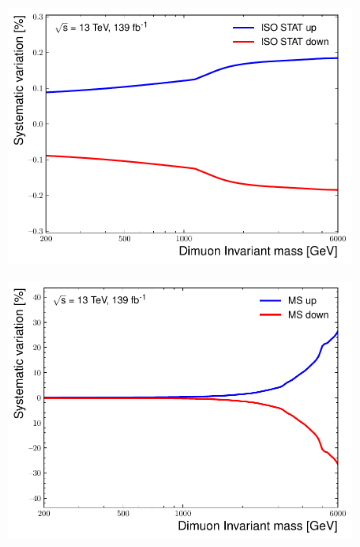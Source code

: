 \begin{figure}[]
    \centering
    \begin{subfigure}[b]{0.42\textwidth}
        \centering
        \includegraphics[width=\textwidth]{figures/analysis/datamc/Uncertainties/exp/mm/m_uu_pstOR_MUON_EFF_ISO_STAT__1up.pdf}
        \label{fig:uncert:mmIso}
    \end{subfigure}
    \begin{subfigure}[b]{0.42\textwidth}
        \centering
        \includegraphics[width=\textwidth]{figures/analysis/datamc/Uncertainties/exp/mm/m_uu_pstOR_MUON_MS__1up.pdf}
        \label{fig:uncert:mmMC}
    \end{subfigure}
    \begin{subfigure}[b]{0.42\textwidth}

\end{subfigure}
\end{figure}

